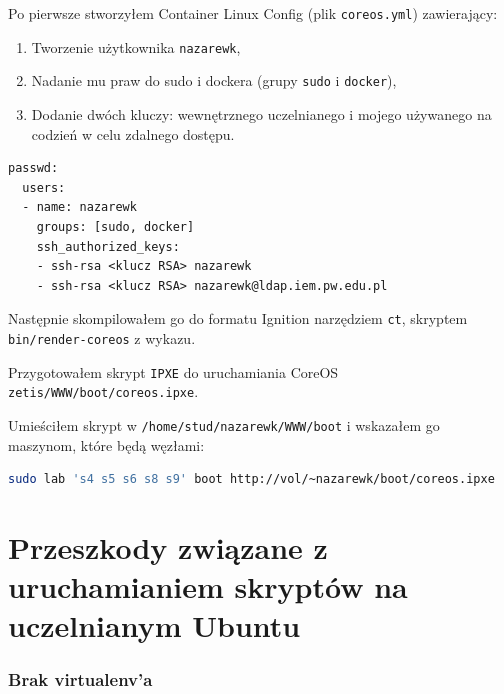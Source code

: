 \documentclass[a4paper,12pt,twoside,openany]{report}
\providecommand{\tightlist}{%
  \setlength{\itemsep}{0pt}\setlength{\parskip}{0pt}}
\newcommand{\passthrough}[1]{#1}
\begin{document}
Po pierwsze stworzyłem Container Linux Config (plik
\passthrough{\lstinline!coreos.yml!}) zawierający:

\begin{enumerate}
\def\labelenumi{\arabic{enumi}.}
\tightlist
\item
  Tworzenie użytkownika \passthrough{\lstinline!nazarewk!},
\item
  Nadanie mu praw do sudo i dockera (grupy
  \passthrough{\lstinline!sudo!} i \passthrough{\lstinline!docker!}),
\item
  Dodanie dwóch kluczy: wewnętrznego uczelnianego i mojego używanego na
  codzień w celu zdalnego dostępu.
\end{enumerate}

\begin{lstlisting}
passwd:
  users:
  - name: nazarewk
    groups: [sudo, docker]
    ssh_authorized_keys:
    - ssh-rsa <klucz RSA> nazarewk
    - ssh-rsa <klucz RSA> nazarewk@ldap.iem.pw.edu.pl
\end{lstlisting}

Następnie skompilowałem go do formatu Ignition narzędziem
\passthrough{\lstinline!ct!}, skryptem
\passthrough{\lstinline!bin/render-coreos!} z wykazu.

Przygotowałem skrypt \passthrough{\lstinline!IPXE!} do uruchamiania
CoreOS \passthrough{\lstinline!zetis/WWW/boot/coreos.ipxe!}.

Umieściłem skrypt w
\passthrough{\lstinline!/home/stud/nazarewk/WWW/boot!} i wskazałem go
maszynom, które będą węzłami:

\begin{lstlisting}[language=bash]
sudo lab 's4 s5 s6 s8 s9' boot http://vol/~nazarewk/boot/coreos.ipxe 
\end{lstlisting}

\hypertarget{przeszkody-zwiux105zane-z-uruchamianiem-skryptuxf3w-na-uczelnianym-ubuntu}{%
\section{Przeszkody związane z uruchamianiem skryptów na uczelnianym
Ubuntu}\label{przeszkody-zwiux105zane-z-uruchamianiem-skryptuxf3w-na-uczelnianym-ubuntu}}

\hypertarget{brak-virtualenva}{%
\subsubsection{Brak virtualenv'a}\label{brak-virtualenva}}
\end{document}
